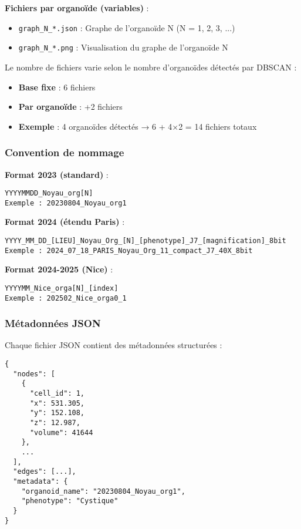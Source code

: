 \textbf{Fichiers par organoïde (variables)} :
\begin{itemize}
    \item \texttt{graph\_N\_*.json} : Graphe de l'organoïde N (N = 1, 2, 3, ...)
    \item \texttt{graph\_N\_*.png} : Visualisation du graphe de l'organoïde N
\end{itemize}

Le nombre de fichiers varie selon le nombre d'organoïdes détectés par DBSCAN :
\begin{itemize}
    \item \textbf{Base fixe} : 6 fichiers
    \item \textbf{Par organoïde} : +2 fichiers
    \item \textbf{Exemple} : 4 organoïdes détectés → 6 + 4×2 = 14 fichiers totaux
\end{itemize}

\subsubsection{Convention de nommage}

\textbf{Format 2023 (standard)} :
\begin{verbatim}
YYYYMMDD_Noyau_org[N]
Exemple : 20230804_Noyau_org1
\end{verbatim}

\textbf{Format 2024 (étendu Paris)} :
\begin{verbatim}
YYYY_MM_DD_[LIEU]_Noyau_Org_[N]_[phenotype]_J7_[magnification]_8bit
Exemple : 2024_07_18_PARIS_Noyau_Org_11_compact_J7_40X_8bit
\end{verbatim}

\textbf{Format 2024-2025 (Nice)} :
\begin{verbatim}
YYYYMM_Nice_orga[N]_[index]
Exemple : 202502_Nice_orga0_1
\end{verbatim}

\subsubsection{Métadonnées JSON}

Chaque fichier JSON contient des métadonnées structurées :

\begin{verbatim}
{
  "nodes": [
    {
      "cell_id": 1,
      "x": 531.305,
      "y": 152.108,
      "z": 12.987,
      "volume": 41644
    },
    ...
  ],
  "edges": [...],
  "metadata": {
    "organoid_name": "20230804_Noyau_org1",
    "phenotype": "Cystique"
  }
}
\end{verbatim}

